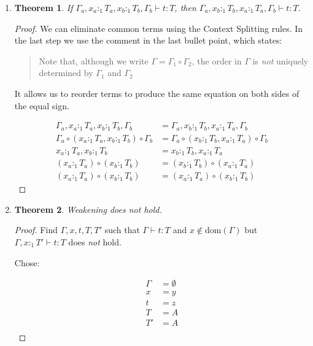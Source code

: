 \documentclass[13pt, a4paper]{article}
\newtheorem{theorem}{Theorem}
\begin{document}
\begin{enumerate}
  
\item %
\begin{theorem}\label{thm:4-exchange}
If $\Gamma_a,x_a:_1T_a,x_b:_1T_b,\Gamma_b \vdash t:T$, then $\Gamma_a,x_b:_1T_b,x_a:_1T_a,\Gamma_b \vdash t:T$.
\end{theorem}
\begin{proof}

We can eliminate common terms using the Context Splitting rules. In the last step we use the comment in the last bullet point, which states:

\begin{quote}
Note that, although we write $\Gamma = \Gamma_1 \circ \Gamma_2$, the order in $\Gamma$ is \textit{not} uniquely determined by $\Gamma_1$ and $\Gamma_2$
\end{quote}

It allows us to reorder terms to produce the same equation on both sides of the equal sign.

\begin{align}
\Gamma_a,x_a:_1T_a,x_b:_1T_b,\Gamma_b &= \Gamma_a,x_b:_1T_b,x_a:_1T_a,\Gamma_b \\
\Gamma_a\circ(x_a:_1T_a,x_b:_1T_b) \circ \Gamma_b &= \Gamma_a\circ(x_b:_1T_b,x_a:_1T_a) \circ \Gamma_b \\
x_a:_1T_a,x_b:_1T_b &= x_b:_1T_b,x_a:_1T_a \\
(x_a:_1T_a) \circ (x_b:_1T_b) &= (x_b:_1T_b) \circ (x_a:_1T_a) \\
(x_a:_1T_a) \circ (x_b:_1T_b) &= (x_a:_1T_a) \circ (x_b:_1T_b)
\end{align}

\end{proof}
  
\item %
\begin{theorem}\label{thm:4-exchange}
Weakening does not hold.
\end{theorem}
\begin{proof}
Find $\Gamma, x, t, T, T'$ such that $\Gamma \vdash t : T$ and $x\notin\text{dom}(\Gamma)$ but $\Gamma,x:_1T'\vdash t:T$ does \textit{not} hold.

Chose:

\begin{align}
  \Gamma &= \emptyset\\
  x &= y\\
  t &= z\\
  T &= A\\
  T' &= A\\
\end{align}


\end{proof}
\end{enumerate}
\end{document}
